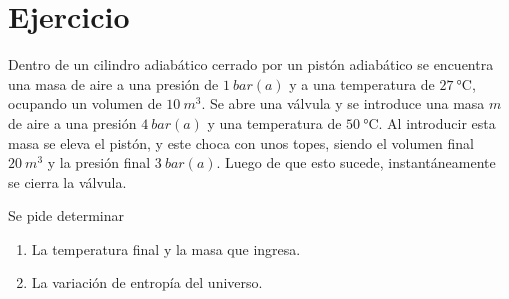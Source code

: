 \section{Ejercicio}\label{ej:Chap07Ejercicio26}
Dentro de un cilindro adiabático cerrado por un pistón adiabático se encuentra una masa de aire a una presión de $\SI{1}{bar(a)}$ y a una temperatura de $\SI{27}{\celsius}$, ocupando un volumen de $\SI{10}{m^3}$. Se abre una válvula y se introduce una masa $m$ de aire a una presión $\SI{4}{bar(a)}$ y una temperatura de $\SI{50}{\celsius}$. Al introducir esta masa se eleva el pistón, y este choca con unos topes, siendo el volumen final $\SI{20}{m^3}$ y la presión final $\SI{3}{bar(a)}$. Luego de que esto sucede, instantáneamente se cierra la válvula.

Se pide determinar
\begin{enumerate}
    \item La temperatura final y la masa que ingresa.
    \item La variación de entropía del universo.
\end{enumerate}